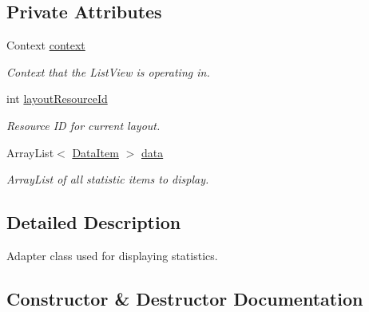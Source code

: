 \subsection*{Private Attributes}
\begin{DoxyCompactItemize}
\item 
\mbox{\label{class_android_app_1_1_data_list_adapter_a739dc817ded5d59af25f97be1a88cf75}} 
Context \hyperlink{class_android_app_1_1_data_list_adapter_a739dc817ded5d59af25f97be1a88cf75}{context}
\begin{DoxyCompactList}\small\item\em Context that the List\+View is operating in. \end{DoxyCompactList}\item 
\mbox{\label{class_android_app_1_1_data_list_adapter_ac4680f2696f50995ecd43fa418f15524}} 
int \hyperlink{class_android_app_1_1_data_list_adapter_ac4680f2696f50995ecd43fa418f15524}{layout\+Resource\+Id}
\begin{DoxyCompactList}\small\item\em Resource ID for current layout. \end{DoxyCompactList}\item 
\mbox{\label{class_android_app_1_1_data_list_adapter_a733766e9ddd9f1cc3943dd83fc734c59}} 
Array\+List$<$ \hyperlink{class_android_app_1_1_data_item}{Data\+Item} $>$ \hyperlink{class_android_app_1_1_data_list_adapter_a733766e9ddd9f1cc3943dd83fc734c59}{data}
\begin{DoxyCompactList}\small\item\em Array\+List of all statistic items to display. \end{DoxyCompactList}\end{DoxyCompactItemize}


\subsection{Detailed Description}
Adapter class used for displaying statistics. 

\subsection{Constructor \& Destructor Documentation}
\mbox{\label{class_android_app_1_1_data_list_adapter_a654a6659bcdfdd08be0d7684269c1750}} 
